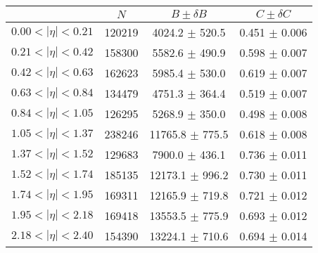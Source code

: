 \begin{tabular}{lccc}
\hline
    &   $N$   & $B \pm \delta B$  &  $C \pm \delta C$ \\
\hline
$0.00 < |\eta| <0.21$          & 120219     & 4024.2     $\pm$ 520.5 & 0.451      $\pm$ 0.006 \\
$0.21 < |\eta| <0.42$          & 158300     & 5582.6     $\pm$ 490.9 & 0.598      $\pm$ 0.007 \\
$0.42 < |\eta| <0.63$          & 162623     & 5985.4     $\pm$ 530.0 & 0.619      $\pm$ 0.007 \\
$0.63 < |\eta| <0.84$          & 134479     & 4751.3     $\pm$ 364.4 & 0.519      $\pm$ 0.007 \\
$0.84 < |\eta| <1.05$          & 126295     & 5268.9     $\pm$ 350.0 & 0.498      $\pm$ 0.008 \\
$1.05 < |\eta| <1.37$          & 238246     & 11765.8    $\pm$ 775.5 & 0.618      $\pm$ 0.008 \\
$1.37 < |\eta| <1.52$          & 129683     & 7900.0     $\pm$ 436.1 & 0.736      $\pm$ 0.011 \\
$1.52 < |\eta| <1.74$          & 185135     & 12173.1    $\pm$ 996.2 & 0.730      $\pm$ 0.011 \\
$1.74 < |\eta| <1.95$          & 169311     & 12165.9    $\pm$ 719.8 & 0.721      $\pm$ 0.012 \\
$1.95 < |\eta| <2.18$          & 169418     & 13553.5    $\pm$ 775.9 & 0.693      $\pm$ 0.012 \\
$2.18 < |\eta| <2.40$          & 154390     & 13224.1    $\pm$ 710.6 & 0.694      $\pm$ 0.014 \\
\hline
\end{tabular}
